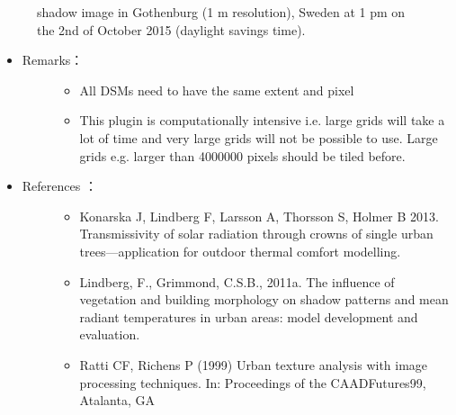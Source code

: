 \documentclass[letterpaper,10pt,english]{sphinxmanual}
\begin{document}
\begin{figure}[htbp]
\centering
\capstart

\noindent{}
\caption{shadow image in Gothenburg (1 m resolution), Sweden at 1 pm on the 2nd of October 2015 (daylight savings time).}\label{\detokenize{processor/Solar Radiation Daily Shadow Pattern:id2}}\end{figure}
\begin{itemize}
\item {} \begin{description}
\item[{Remarks：}] \leavevmode\begin{itemize}
\item {} 
All DSMs need to have the same extent and pixel

\item {} 
This plugin is computationally intensive i.e. large grids will take a lot of time and very large grids will not be possible to use. Large grids e.g. larger than 4000000 pixels should be tiled before.

\end{itemize}

\end{description}

\item {} \begin{description}
\item[{References ：}] \leavevmode\begin{itemize}
\item {} 
Konarska J, Lindberg F, Larsson A, Thorsson S, Holmer B 2013. Transmissivity of solar radiation through crowns of single urban trees—application for outdoor thermal comfort modelling. 

\item {} 
Lindberg, F., Grimmond, C.S.B., 2011a. The influence of vegetation and building morphology on shadow patterns and mean radiant temperatures in urban areas: model development and evaluation. 

\item {} 
Ratti CF, Richens P (1999) Urban texture analysis with image processing techniques. In: Proceedings of the CAADFutures99, Atalanta, GA

\end{itemize}

\end{description}

\end{itemize}
\end{document}

